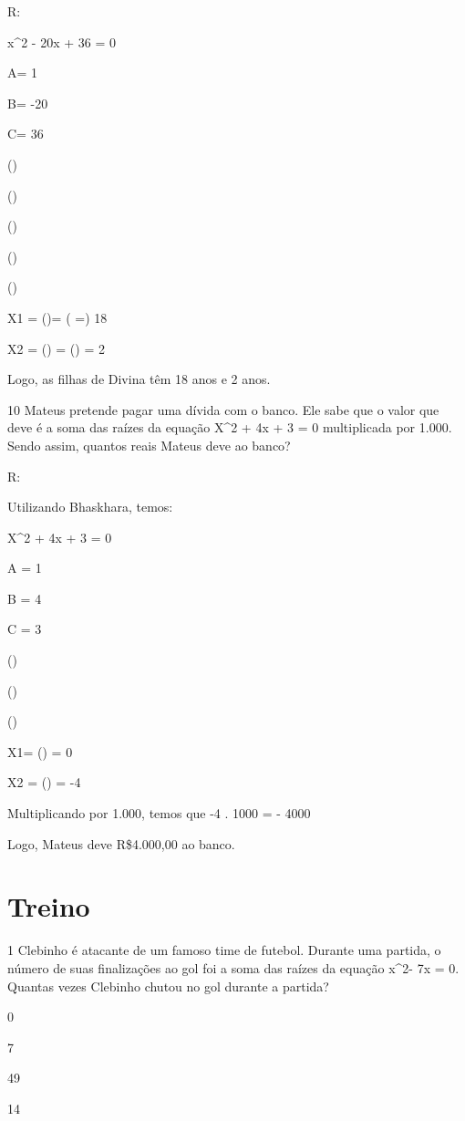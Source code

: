 {R:

x^2 - 20x + 36 = 0

A= 1

B= -20

C= 36

()

()

()

()

()

X1 = ()= ( =) 18

X2 = () = () = 2

Logo, as filhas de Divina têm 18 anos e 2 anos.

\num{10} Mateus pretende pagar uma dívida com o banco. Ele sabe que o valor
que deve é a soma das raízes da equação X^2 + 4x + 3 = 0 multiplicada por
1.000. Sendo assim, quantos reais Mateus deve ao banco?

R:

Utilizando Bhaskhara, temos:

X^2 + 4x + 3 = 0

A = 1

B = 4

C = 3

()

()

()

X1= () = 0

X2 = () = -4

Multiplicando por 1.000, temos que -4 . 1000 = - 4000

Logo, Mateus deve R\$4.000,00 ao banco.

\section{Treino}

\num{1} Clebinho é atacante de um famoso time de futebol. Durante uma
partida, o número de suas finalizações ao gol foi a soma das raízes da
equação x^2- 7x = 0. Quantas vezes Clebinho chutou no gol durante a
partida?
\item 0
\item 7
\item 49
\item 14

}
